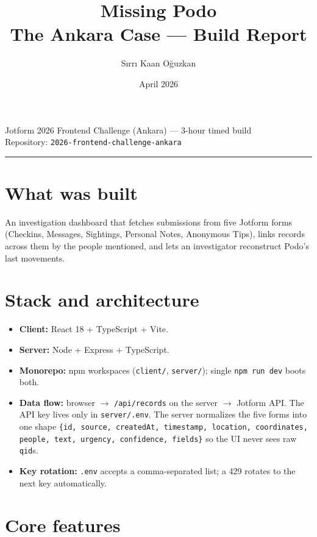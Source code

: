 \documentclass[11pt,a4paper]{article}
\title{\vspace{-2em}\textbf{\Huge Missing Podo}\\[0.3em]\Large The Ankara Case --- Build Report}
\author{Sırrı Kaan Oğuzkan}
\date{April 2026}
\newcommand{\code}[1]{\texttt{\small #1}}
\begin{document}
\maketitle
\thispagestyle{empty}

\vspace{-1em}
\begin{center}
\small\color{muted}
Jotform 2026 Frontend Challenge (Ankara) --- 3-hour timed build \\
Repository: \code{2026-frontend-challenge-ankara}
\end{center}

\vspace{1em}
\hrule
\vspace{1em}

\section{What was built}

An investigation dashboard that fetches submissions from five Jotform forms
(Checkins, Messages, Sightings, Personal Notes, Anonymous Tips), links records
across them by the people mentioned, and lets an investigator reconstruct
Podo's last movements.

\section{Stack and architecture}

\begin{itemize}
  \item \textbf{Client:} React 18 + TypeScript + Vite.
  \item \textbf{Server:} Node + Express + TypeScript.
  \item \textbf{Monorepo:} npm workspaces (\code{client/}, \code{server/}); single \code{npm run dev} boots both.
  \item \textbf{Data flow:} browser $\rightarrow$ \code{/api/records} on the server $\rightarrow$ Jotform API. The API key lives only in \code{server/.env}. The server normalizes the five forms into one shape \code{\{id, source, createdAt, timestamp, location, coordinates, people, text, urgency, confidence, fields\}} so the UI never sees raw \code{qid}s.
  \item \textbf{Key rotation:} \code{.env} accepts a comma-separated list; a 429 rotates to the next key automatically.
\end{itemize}

\section{Core features}
\end{document}
